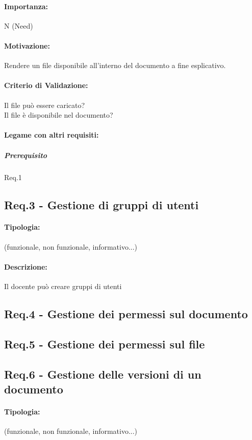 \paragraph{Importanza:}
	N (Need)
\paragraph{Motivazione:}
	Rendere un file disponibile all'interno del documento a fine esplicativo.
\paragraph{Criterio di Validazione:}
	Il file può essere caricato?\\
	Il file è disponibile nel documento?
\paragraph{Legame con altri requisiti:}
	\subparagraph{Prerequisito} Req.1


\subsection{Req.3 - Gestione di gruppi di utenti}
\paragraph{Tipologia:}
	(funzionale, non funzionale, informativo...)
\paragraph{Descrizione:}
	Il docente può creare gruppi di utenti


\subsection{Req.4 - Gestione dei permessi sul documento}
\subsection{Req.5 - Gestione dei permessi sul file}







\subsection{Req.6 - Gestione delle versioni di un documento}
\paragraph{Tipologia:}
	(funzionale, non funzionale, informativo...)
